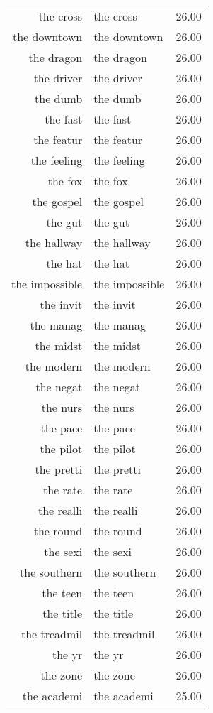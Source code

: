 \begin{table}[ht]
\begin{tabular}{rlr}
  the cross & the cross & 26.00 \\ 
  the downtown & the downtown & 26.00 \\ 
  the dragon & the dragon & 26.00 \\ 
  the driver & the driver & 26.00 \\ 
  the dumb & the dumb & 26.00 \\ 
  the fast & the fast & 26.00 \\ 
  the featur & the featur & 26.00 \\ 
  the feeling & the feeling & 26.00 \\ 
  the fox & the fox & 26.00 \\ 
  the gospel & the gospel & 26.00 \\ 
  the gut & the gut & 26.00 \\ 
  the hallway & the hallway & 26.00 \\ 
  the hat & the hat & 26.00 \\ 
  the impossible & the impossible & 26.00 \\ 
  the invit & the invit & 26.00 \\ 
  the manag & the manag & 26.00 \\ 
  the midst & the midst & 26.00 \\ 
  the modern & the modern & 26.00 \\ 
  the negat & the negat & 26.00 \\ 
  the nurs & the nurs & 26.00 \\ 
  the pace & the pace & 26.00 \\ 
  the pilot & the pilot & 26.00 \\ 
  the pretti & the pretti & 26.00 \\ 
  the rate & the rate & 26.00 \\ 
  the realli & the realli & 26.00 \\ 
  the round & the round & 26.00 \\ 
  the sexi & the sexi & 26.00 \\ 
  the southern & the southern & 26.00 \\ 
  the teen & the teen & 26.00 \\ 
  the title & the title & 26.00 \\ 
  the treadmil & the treadmil & 26.00 \\ 
  the yr & the yr & 26.00 \\ 
  the zone & the zone & 26.00 \\ 
  the academi & the academi & 25.00 \\ 

\end{tabular}
\end{table}

